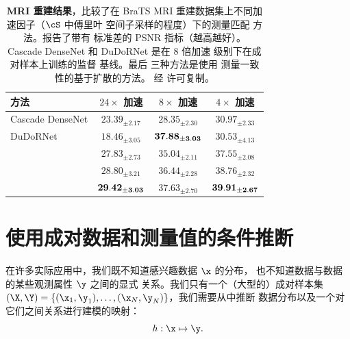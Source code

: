 \documentclass[../../book-main_zh.tex]{subfiles}
\begin{document}
\begin{table}[t]
    \centering
    \begin{tabular}{@{}lccc@{}}
        \toprule
        方法 & $24\times$ 加速 & $8\times$ 加速 & $4\times$ 加速 \\
        \midrule
        Cascade DenseNet & $23.39_{\pm 2.17}$ & $28.35_{\pm 2.30}$ &
        $30.97_{\pm 2.33}$ \\
        DuDoRNet & $18.46_{\pm 3.05}$ & $\bf 37.88_{\pm 3.03}$ &
        $30.53_{\pm 4.13}$ \\
        \textcite{song2020score} & $27.83_{\pm 2.73}$ & $35.04_{\pm
        2.11}$ & $37.55_{\pm 2.08}$ \\
        \textcite{NEURIPS2021_7d6044e9} & $28.80_{\pm 3.21}$ &
        $36.44_{\pm 2.28}$ & $38.76_{\pm 2.32}$ \\
        \textcite{song2022solving} & $\bf 29.42_{\pm 3.03}$ &
        $37.63_{\pm 2.70}$ & $\bf 39.91_{\pm 2.67}$ \\
        \bottomrule
    \end{tabular}
    \caption{\textbf{MRI 重建结果}，比较了在 BraTS MRI
        重建数据集上不同加速因子（$\cS$ 中傅里叶
        空间子采样的程度）下的测量匹配
        方法。报告了带有
        标准差的 PSNR 指标（越高越好）。
        Cascade DenseNet
        \cite{NEURIPS2019_1e48c442} 和 DuDoRNet \cite{9156506} 是在 8 倍加速
        级别下在成对样本上训练的监督
        基线。最后
        三种方法是使用
        测量一致性的基于扩散的方法。
    经 \textcite{song2022solving} 许可复制。}
    \label{tab:mri-reconstruction}
\end{table}

\section{使用成对数据和测量值的条件推断}
\label{sec:paired-data}
在许多实际应用中，我们既不知道感兴趣数据 $\x$ 的分布，
也不知道数据与数据的某些观测属性 $\y$ 之间的显式
关系。我们只有一个（大型的）成对样本集 $(\X, \Y) =
\{ (\x_1, \y_1), \ldots, (\x_N, \y_N) \}$，我们需要从中推断
数据分布以及一个对它们之间关系进行建模的映射：
\begin{equation}
    h: \x \mapsto \y.
\end{equation}
\end{document}
